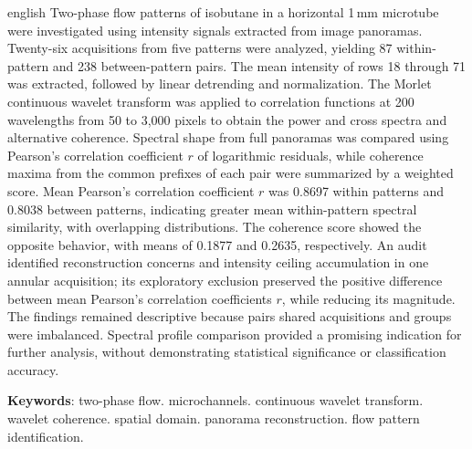 \begin{resumo}[Abstract]
 \begin{otherlanguage*}{english}
Two-phase flow patterns of isobutane in a horizontal 1\,mm microtube were investigated
using intensity signals extracted from image panoramas. Twenty-six acquisitions from
five patterns were analyzed, yielding 87 within-pattern and 238 between-pattern pairs.
The mean intensity of rows 18 through 71 was extracted, followed by linear detrending
and normalization. The Morlet continuous wavelet transform was applied to correlation
functions at 200 wavelengths from 50 to 3,000 pixels to obtain the power and cross
spectra and alternative coherence. Spectral shape from full panoramas was compared
using Pearson's correlation coefficient $r$ of logarithmic residuals, while coherence
maxima from the common prefixes of each pair were summarized by a weighted score.
Mean Pearson's correlation coefficient $r$ was 0.8697 within patterns and 0.8038 between
patterns, indicating greater mean within-pattern spectral similarity, with overlapping
distributions. The coherence score showed the opposite behavior, with means of 0.1877
and 0.2635, respectively. An audit identified reconstruction concerns and intensity ceiling accumulation
in one annular acquisition; its exploratory exclusion preserved the positive difference
between mean Pearson's correlation coefficients $r$, while reducing its magnitude.
The findings remained descriptive because pairs shared acquisitions and groups were
imbalanced. Spectral profile comparison provided a promising indication for further
analysis, without demonstrating statistical significance or classification accuracy.

   \vspace{\onelineskip}

   \noindent
   \textbf{Keywords}: two-phase flow. microchannels. continuous wavelet transform. wavelet coherence. spatial domain. panorama reconstruction. flow pattern identification.
 \end{otherlanguage*}
\end{resumo}


\listoffigures*
\cleardoublepage

\listofquadros*
\cleardoublepage

\listoftables*
\cleardoublepage

